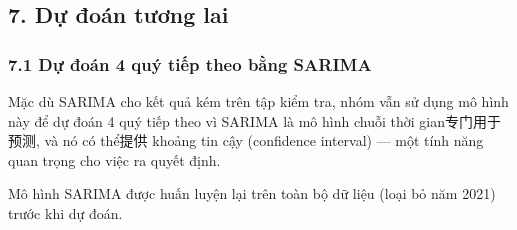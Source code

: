 \documentclass[11pt]{article}
\begin{document}
    \subsection{7. Dự đoán tương
lai}\label{dux1ef1-ux111ouxe1n-tux1b0ux1a1ng-lai}

\subsubsection{7.1 Dự đoán 4 quý tiếp theo bằng
SARIMA}\label{dux1ef1-ux111ouxe1n-4-quuxfd-tiux1ebfp-theo-bux1eb1ng-sarima}

Mặc dù SARIMA cho kết quả kém trên tập kiểm tra, nhóm vẫn sử dụng mô
hình này để dự đoán 4 quý tiếp theo vì SARIMA là mô hình chuỗi thời
gian专门用于预测, và nó có thể提供 khoảng tin cậy (confidence interval)
--- một tính năng quan trọng cho việc ra quyết định.

Mô hình SARIMA được huấn luyện lại trên toàn bộ dữ liệu (loại bỏ năm
2021) trước khi dự đoán.
\end{document}
